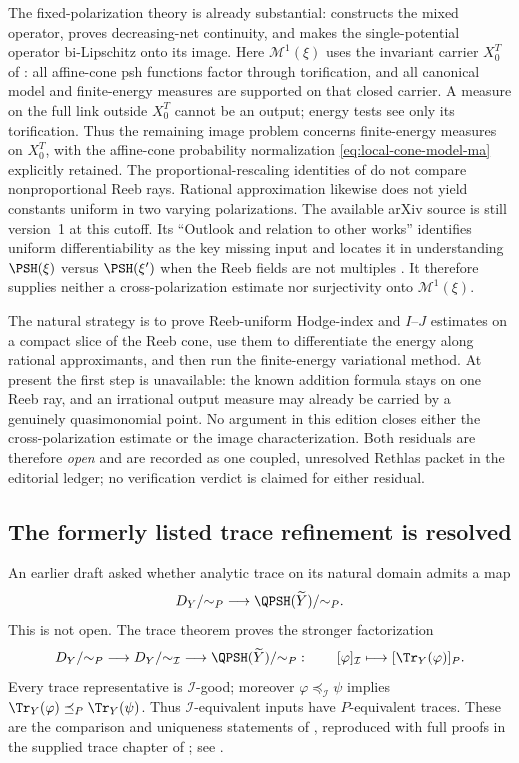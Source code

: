 The fixed-polarization theory is already substantial:
 constructs the mixed operator,
proves decreasing-net continuity, and makes the single-potential operator
bi-Lipschitz onto its image.  Here \(\mathcal M^1(\xi)\) uses the invariant
carrier \(X_0^T\) of : all affine-cone psh
functions factor through torification, and all canonical model and
finite-energy measures are supported on that closed carrier.  A measure
on the full link outside \(X_0^T\) cannot be an output; energy tests see
only its torification.  Thus the remaining image problem concerns
finite-energy measures on \(X_0^T\), with the affine-cone probability
normalization \eqref{eq:local-cone-model-ma} explicitly retained.
The proportional-rescaling identities of
\cite[Proposition~3.3]{Wu24AffineCones} do not compare nonproportional Reeb
rays.  Rational approximation likewise does not yield constants uniform in
two varying polarizations.  The available arXiv source is still
version~1 at this cutoff.  Its ``Outlook and relation to other works''
identifies uniform differentiability as the key missing input and locates
it in understanding \(\PSH(\xi)\) versus \(\PSH(\xi')\) when the Reeb
fields are not multiples \cite{Wu24AffineCones}.  It therefore supplies
neither a cross-polarization estimate nor surjectivity onto
\(\mathcal M^1(\xi)\).

The natural strategy is to prove Reeb-uniform Hodge-index and
\(I\)--\(J\) estimates on a compact slice of the Reeb cone, use them to
differentiate the energy along rational approximants, and then run the
finite-energy variational method.  At present the first step is unavailable:
the known addition formula stays on one Reeb ray, and an irrational output
measure may already be carried by a genuinely quasimonomial point.  No
argument in this edition closes either the cross-polarization estimate or the
image characterization.  Both residuals are therefore \emph{open} and are
recorded as one coupled, unresolved Rethlas packet in the editorial ledger;
no verification verdict is claimed for either residual.

\subsection{The formerly listed trace refinement is resolved}
\label{sec:frontier-trace-p-resolved}

An earlier draft asked whether analytic trace on its natural domain admits
a map
\[
 D_Y/{\sim_P}\longrightarrow
 \QPSH(\widetilde Y)/{\sim_P}.
\]
This is not open.  The trace theorem proves the stronger factorization
\[
 D_Y/{\sim_P}
 \longrightarrow
 D_Y/{\sim_{\mathcal I}}
 \longrightarrow
 \QPSH(\widetilde Y)/{\sim_P}:
 \qquad
 [\varphi]_{\mathcal I}\longmapsto[\Tr_Y(\varphi)]_P.
\]
Every trace representative is \(\mathcal I\)-good; moreover
\(\varphi\preceq_{\mathcal I}\psi\) implies
\(\Tr_Y(\varphi)\preceq_P\Tr_Y(\psi)\).  Thus
\(\mathcal I\)-equivalent inputs have \(P\)-equivalent traces.  These are
the comparison and uniqueness statements of \cite{DX24}, reproduced with
full proofs in the supplied trace chapter of \cite{XiaBook}; see
.

